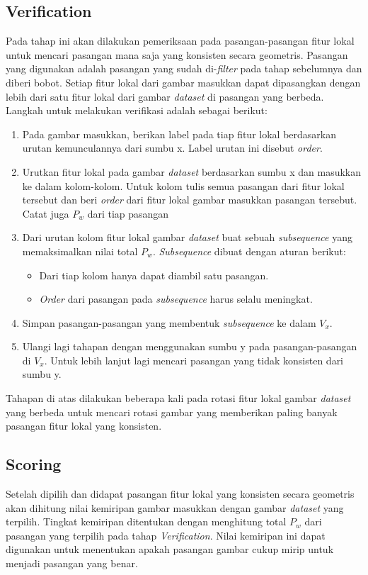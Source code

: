 \subsection{Verification}
Pada tahap ini akan dilakukan pemeriksaan pada pasangan-pasangan fitur lokal untuk mencari pasangan mana saja yang konsisten secara geometris. Pasangan yang digunakan adalah pasangan yang sudah di-\textit{filter} pada tahap sebelumnya dan diberi bobot. Setiap fitur lokal dari gambar masukkan dapat dipasangkan dengan lebih dari satu fitur lokal dari gambar \textit{dataset} di pasangan yang berbeda. Langkah untuk melakukan verifikasi adalah sebagai berikut:
\begin{enumerate}
	\item Pada gambar masukkan, berikan label pada tiap fitur lokal berdasarkan urutan kemunculannya dari sumbu x. Label urutan ini disebut \textit{order}.
	\item Urutkan fitur lokal pada gambar \textit{dataset} berdasarkan sumbu x dan masukkan ke dalam kolom-kolom. Untuk kolom tulis semua pasangan dari fitur lokal tersebut dan beri \textit{order} dari fitur lokal gambar masukkan pasangan tersebut. Catat juga $P_w$ dari tiap pasangan
	\item Dari urutan kolom fitur lokal gambar \textit{dataset} buat sebuah \textit{subsequence} yang memaksimalkan nilai total $P_w$. \textit{Subsequence} dibuat dengan aturan berikut:
	\begin{itemize}
		\item Dari tiap kolom hanya dapat diambil satu pasangan.
		\item \textit{Order} dari pasangan pada \textit{subsequence} harus selalu meningkat.
	\end{itemize}
	\item Simpan pasangan-pasangan yang membentuk \textit{subsequence} ke dalam $V_x$.
	\item Ulangi lagi tahapan dengan menggunakan sumbu y pada pasangan-pasangan di $V_x$. Untuk lebih lanjut lagi mencari pasangan yang tidak konsisten dari sumbu y.
\end{enumerate}
Tahapan di atas dilakukan beberapa kali pada rotasi fitur lokal gambar \textit{dataset} yang berbeda untuk mencari rotasi gambar yang memberikan paling banyak pasangan fitur lokal yang konsisten.

\subsection{Scoring}
Setelah dipilih dan didapat pasangan fitur lokal yang konsisten secara geometris akan dihitung nilai kemiripan gambar masukkan dengan gambar \textit{dataset} yang terpilih. Tingkat kemiripan ditentukan dengan menghitung total $P_w$ dari pasangan yang terpilih pada tahap \textit{Verification}. Nilai kemiripan ini dapat digunakan untuk menentukan apakah pasangan gambar cukup mirip untuk menjadi pasangan yang benar.

